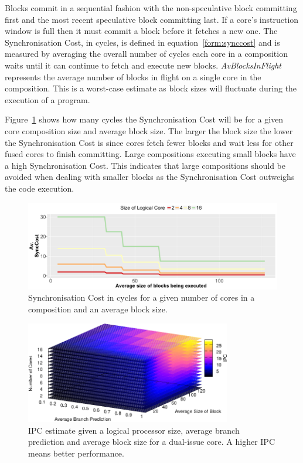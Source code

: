 Blocks commit in a sequential fashion with the non-speculative block committing first and the most recent speculative block committing last.
If a core's instruction window is full then it must commit a block before it fetches a new one.
The Synchronisation Cost, in cycles, is defined in equation~\ref{form:synccost} and is measured by averaging the overall number of cycles each core in a composition waits until it can continue to fetch and execute new blocks.
\textit{AvBlocksInFlight} represents the average number of blocks in flight on a single core in the composition.
This is a worst-case estimate as block sizes will fluctuate during the execution of a program.

Figure~\ref{fig:sync_cost} shows how many cycles the Synchronisation Cost will be for a given core composition size and average block size.
The larger the block size the lower the Synchronisation Cost is since cores fetch fewer blocks and wait less for other fused cores to finish committing.
Large compositions executing small blocks have a high Synchronisation Cost. 
This indicates that large compositions should be avoided when dealing with smaller blocks as the Synchronisation Cost outweighs the code execution.

\begin{figure}[t]
    \centering
    \includegraphics[width=\textwidth]{cases-paper/graphics/limit_study/sync_cost.pdf}

    \caption{Synchronisation Cost in cycles for a given number of cores in a composition and an average block size.} %
    \label{fig:sync_cost}
	\vspace{1em}
\end{figure}


\begin{figure}[t]
    \centering
    \includegraphics[width=0.8\textwidth]{cases-paper/graphics/limit_study/summary.pdf}
    \caption{IPC estimate given a logical processor size, average branch prediction and average block size for a dual-issue core. A higher IPC means better performance.}
    \label{fig:lm_summ}
\vspace{5mm}
\end{figure}

